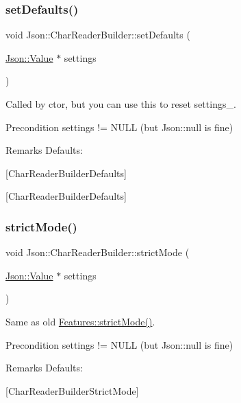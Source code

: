 \subsubsection{\texorpdfstring{set\+Defaults()}{setDefaults()}}
{\footnotesize\ttfamily void Json\+::\+Char\+Reader\+Builder\+::set\+Defaults (\begin{DoxyParamCaption}\item[{\hyperlink{classJson_1_1Value}{Json\+::\+Value} $\ast$}]{settings }\end{DoxyParamCaption})\hspace{0.3cm}{\ttfamily [static]}}

Called by ctor, but you can use this to reset settings\+\_\+. \begin{DoxyPrecond}{Precondition}
\textquotesingle{}settings\textquotesingle{} != N\+U\+LL (but Json\+::null is fine) 
\end{DoxyPrecond}
\begin{DoxyRemark}{Remarks}
Defaults\+: 
\begin{DoxyCodeInclude}
\end{DoxyCodeInclude}

\end{DoxyRemark}
\mbox{[}Char\+Reader\+Builder\+Defaults\mbox{]}

\mbox{[}Char\+Reader\+Builder\+Defaults\mbox{]} \mbox{\label{classJson_1_1CharReaderBuilder_a9c19e3c5475f9072d527810d4bf56749_a9c19e3c5475f9072d527810d4bf56749}} 
\subsubsection{\texorpdfstring{strict\+Mode()}{strictMode()}}
{\footnotesize\ttfamily void Json\+::\+Char\+Reader\+Builder\+::strict\+Mode (\begin{DoxyParamCaption}\item[{\hyperlink{classJson_1_1Value}{Json\+::\+Value} $\ast$}]{settings }\end{DoxyParamCaption})\hspace{0.3cm}{\ttfamily [static]}}

Same as old \hyperlink{classJson_1_1Features_ae23176c14b2e79e81fb61fb1a8ab58ee_ae23176c14b2e79e81fb61fb1a8ab58ee}{Features\+::strict\+Mode()}. \begin{DoxyPrecond}{Precondition}
\textquotesingle{}settings\textquotesingle{} != N\+U\+LL (but Json\+::null is fine) 
\end{DoxyPrecond}
\begin{DoxyRemark}{Remarks}
Defaults\+: 
\begin{DoxyCodeInclude}
\end{DoxyCodeInclude}

\end{DoxyRemark}
\mbox{[}Char\+Reader\+Builder\+Strict\+Mode\mbox{]}

